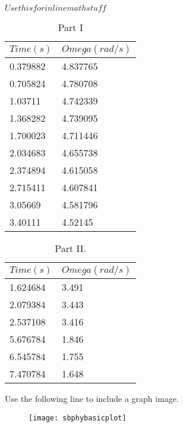 \documentclass[a4paper,12pt]{article}
\begin{document}
\(Use this for inline math stuff\)

\begin{table}[!htb]
\centering
\begin{tabular}{|l|l|}
\hline
$Time (s)$&$Omega (rad/s)$\\
\hline
0.379882&4.837765\\
0.705824&4.780708\\
1.03711&4.742339\\
1.368282&4.739095\\
1.700023&4.711446\\
2.034683&4.655738\\
2.374894&4.615058\\
2.715411&4.607841\\
3.05669&4.581796\\
3.40111&4.52145\\
\hline
\end{tabular}
\caption {Part I} \label{tab:ia}
\end{table}

\begin{table}[!htb]
\centering
\begin{tabular}{|l|l|}
\hline
$Time (s)$&$Omega (rad/s)$\\
\hline
1.624684&3.491\\
2.079384&3.443\\
2.537108&3.416\\
\hline
\hline
5.676784&1.846\\
6.545784&1.755\\
7.470784&1.648\\
\hline
\end{tabular}
\caption {Part II.} \label{tab:ii}
\end{table}

Use the following line to include a graph image. 
\begin{figure}[!htb]
\texttt{[image: sbphybasicplot]}
\end{figure}
\end{document}
